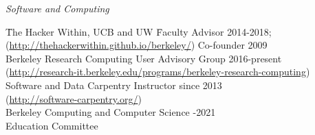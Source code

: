 \vspace*{-.5em}
\textit{Software and Computing}
\begin{tabbing}
%
\hspace*{2 em}\= The Hacker Within, UCB and UW \hspace*{6em} \= Faculty Advisor 2014-2018; \\
\> \hspace*{2 em}(\href{http://thehackerwithin.github.io/berkeley/}{http://thehackerwithin.github.io/berkeley/}) \> Co-founder 2009\\
%
\> Berkeley Research Computing  \> User Advisory Group 2016-present \\
\> \hspace*{2 em}(\href{http://research-it.berkeley.edu/programs/berkeley-research-computing}{http://research-it.berkeley.edu/programs/berkeley-research-computing})\\
%
\> Software and Data Carpentry  \> Instructor since 2013\\
\> \hspace*{2 em}(\href{http://software-carpentry.org/}{http://software-carpentry.org/})\\
%
%
\> Berkeley Computing and Computer Science -2021 \\
\> \hspace*{2 em}Education Committee%
\end{tabbing}


